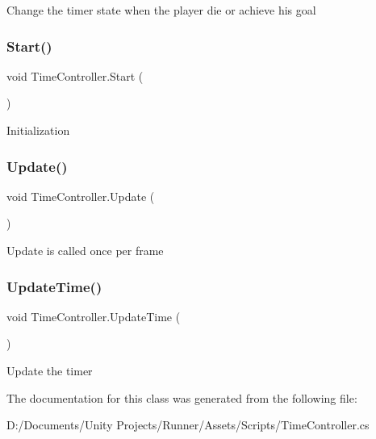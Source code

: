 Change the timer state when the player die or achieve his goal \mbox{\label{class_time_controller_ae2531258e75cb1af4c09edd88a89d147}} 
\subsubsection{\texorpdfstring{Start()}{Start()}}
{\footnotesize\ttfamily void Time\+Controller.\+Start (\begin{DoxyParamCaption}{ }\end{DoxyParamCaption})\hspace{0.3cm}{\ttfamily [private]}}

Initialization \mbox{\label{class_time_controller_a4b60f339ab4270f1bf015d4a44083184}} 
\subsubsection{\texorpdfstring{Update()}{Update()}}
{\footnotesize\ttfamily void Time\+Controller.\+Update (\begin{DoxyParamCaption}{ }\end{DoxyParamCaption})\hspace{0.3cm}{\ttfamily [private]}}

Update is called once per frame \mbox{\label{class_time_controller_ad911152a7d332d8458803fdca5475a24}} 
\subsubsection{\texorpdfstring{Update\+Time()}{UpdateTime()}}
{\footnotesize\ttfamily void Time\+Controller.\+Update\+Time (\begin{DoxyParamCaption}{ }\end{DoxyParamCaption})\hspace{0.3cm}{\ttfamily [private]}}

Update the timer 

The documentation for this class was generated from the following file\+:\begin{DoxyCompactItemize}
\item 
D\+:/\+Documents/\+Unity Projects/\+Runner/\+Assets/\+Scripts/Time\+Controller.\+cs\end{DoxyCompactItemize}
